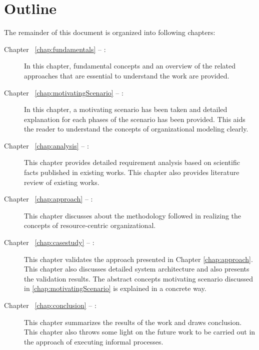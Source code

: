 \section {Outline}
\label{sec:outline}
The remainder of this document is organized into following chapters:
\begin{description}
	\item[Chapter ~\ref{chap:fundamentals} -- :] In this chapter, fundamental concepts and an overview of the related approaches that are essential to understand the work are provided.
	\item[Chapter ~\ref{chap:motivatingScenario} -- :] In this chapter, a motivating scenario has been taken and detailed explanation for each phases of the scenario has been provided. This aids the reader to understand the concepts of organizational modeling clearly. 
	\item[Chapter ~\ref{chap:analysis} -- :] This chapter provides detailed requirement analysis based on scientific facts published in existing works. This chapter also provides literature review of existing works.
	\item[Chapter ~\ref{chap:approach} -- :] This chapter discusses about the methodology followed in realizing the concepts  of resource-centric organizational.
	\item[Chapter ~\ref{chap:casestudy} -- :] This chapter validates the approach presented in Chapter \ref{chap:approach}. This chapter also discusses detailed system architecture and also presents the validation results. The abstract concepts motivating scenario discussed in \ref{chap:motivatingScenario} is explained in a concrete way.	
	\item[Chapter ~\ref{chap:conclusion} -- :] This chapter summarizes the results of the work and draws conclusion. This chapter also throws some light on the future work to be carried out in the approach of executing informal processes. 
\end{description}